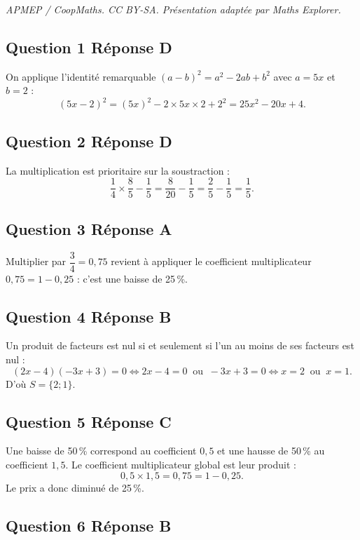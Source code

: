 \documentclass[10pt]{article}
\begin{document}
\noindent\textit{APMEP / CoopMaths. CC BY-SA. Présentation adaptée par Maths Explorer.}\par\medskip
\subsection*{Question 1 \quad Réponse D}

On applique l'identité remarquable $(a-b)^2 = a^2 - 2ab + b^2$ avec $a = 5x$ et $b = 2$ :
\[(5x-2)^2 = (5x)^2 - 2\times 5x\times 2 + 2^2 = 25x^2 - 20x + 4.\]

\subsection*{Question 2 \quad Réponse D}

La multiplication est prioritaire sur la soustraction :
\[\dfrac{1}{4}\times\dfrac{8}{5} - \dfrac{1}{5} = \dfrac{8}{20} - \dfrac{1}{5} = \dfrac{2}{5} - \dfrac{1}{5} = \dfrac{1}{5}.\]

\subsection*{Question 3 \quad Réponse A}

Multiplier par $\dfrac{3}{4} = 0,75$ revient à appliquer le coefficient multiplicateur
$0,75 = 1 - 0,25$ : c'est une baisse de 25\,\%.

\subsection*{Question 4 \quad Réponse B}

Un produit de facteurs est nul si et seulement si l'un au moins de ses facteurs est nul :
\[(2x-4)(-3x+3) = 0 \iff 2x - 4 = 0 \ \text{ ou } \ -3x + 3 = 0 \iff x = 2 \ \text{ ou } \ x = 1.\]
D'où $S = \{2 ; 1\}$.

\subsection*{Question 5 \quad Réponse C}

Une baisse de 50\,\% correspond au coefficient $0,5$ et une hausse de 50\,\% au
coefficient $1,5$. Le coefficient multiplicateur global est leur produit :
\[0,5 \times 1,5 = 0,75 = 1 - 0,25.\]
Le prix a donc diminué de 25\,\%.

\subsection*{Question 6 \quad Réponse B}
\end{document}
